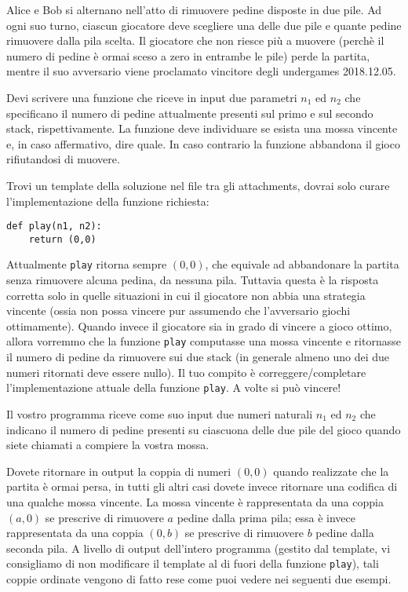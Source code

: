 \renewcommand{\nomebreve}{game2stacks}
\renewcommand{\titolo}{Da quale dei due stacks rimuovere e quanto?}

\introduzione{}

Alice e Bob si alternano nell'atto di rimuovere pedine disposte in due pile.
Ad ogni suo turno, ciascun giocatore deve scegliere una delle due pile e quante pedine rimuovere dalla pila scelta.
Il giocatore che non riesce più a muovere (perchè il numero di pedine è ormai sceso a zero in entrambe le pile) perde la partita, mentre il suo avversario viene proclamato vincitore degli undergames 2018.12.05.

Devi scrivere una funzione che riceve in input due parametri $n_1$ ed $n_2$ che specificano il numero di pedine attualmente presenti sul primo e sul secondo stack, rispettivamente. La funzione deve individuare se esista una mossa vincente e, in caso affermativo, dire quale. In caso contrario la funzione abbandona il gioco rifiutandosi di muovere.

Trovi un template della soluzione nel file \textbf{} tra gli attachments, dovrai solo curare l'implementazione della funzione richiesta:

\begin{verbatim}
def play(n1, n2):
    return (0,0)
\end{verbatim}

Attualmente {\tt play} ritorna sempre $(0,0)$, che equivale ad abbandonare la partita senza rimuovere alcuna pedina, da nessuna pila. Tuttavia questa è la risposta corretta solo in quelle situazioni in cui il giocatore non abbia una strategia vincente (ossia non possa vincere pur assumendo che l'avversario giochi ottimamente). Quando invece il giocatore sia in grado di vincere a gioco ottimo, allora vorremmo che la funzione {\tt play} computasse una mossa vincente e ritornasse il numero di pedine da rimuovere sui due stack (in generale almeno uno dei due numeri ritornati deve essere nullo). Il tuo compito è correggere/completare l'implementazione attuale della funzione {\tt play}. A volte si può vincere! 


Il vostro programma riceve come suo input due numeri naturali $n_1$ ed $n_2$ che indicano il numero di pedine presenti su ciascuona delle due pile del gioco quando siete chiamati a compiere la vostra mossa.


Dovete ritornare in output la coppia di numeri $(0,0)$ quando realizzate che la partita è ormai persa, in tutti gli altri casi dovete invece ritornare una codifica di una qualche mossa vincente. La mossa vincente è rappresentata da una coppia $(a,0)$ se prescrive di rimuovere $a$ pedine dalla prima pila; essa è invece rappresentata da una coppia $(0,b)$ se prescrive di rimuovere $b$ pedine dalla seconda pila. A livello di output dell'intero programma (gestito dal template, vi consigliamo di non modificare il template al di fuori della funzione {\tt play}), tali coppie ordinate vengono di fatto rese come puoi vedere nei seguenti due esempi.

